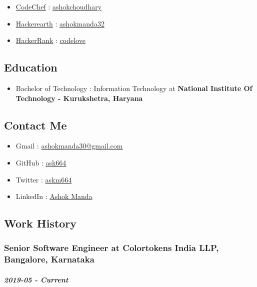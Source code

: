 \begin{itemize}
\itemsep1pt\parskip0pt
\item
  \href{http://codechef.com}{CodeChef} :
  \href{http://codechef.com/users/ashokchoudhary}{ashokchoudhary}
\item
  \href{https://www.hackerearth.com}{Hackerearth} :
  \href{https://www.hackerearth.com/@ashokmanda32}{ashokmanda32}
\item
  \href{http://hackerrank.com}{HackerRank} :
  \href{https://www.hackerrank.com/codelove}{codelove}
\end{itemize}

\subsection{Education}

\begin{itemize}
\itemsep1pt\parskip0pt
\item
  Bachelor of Technology : Information Technology at \textbf{National
  Institute Of Technology - Kurukshetra, Haryana}
\end{itemize}

\subsection{Contact Me}

\begin{itemize}
\itemsep1pt\parskip0pt
\item
  Gmail : \href{mailto:ashokmanda30@gmail.com}{ashokmanda30@gmail.com}
\item
  GitHub : \href{http://github.com/ask664}{ask664}
\item
  Twitter : \href{http://twitter.com/askm664}{askm664}
\item
  LinkedIn :
  \href{https://www.linkedin.com/in/ashok-manda-64a33aa2/}{Ashok Manda}
\end{itemize}

\subsection{Work History}

\subsubsection{Senior Software Engineer at Colortokens India LLP,
Bangalore, Karnataka}

\subparagraph{2019-05 - Current}

